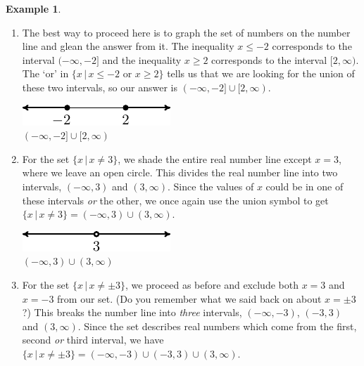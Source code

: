 \documentclass[11pt]{article}
\theoremstyle{definition}  %
\newtheorem{ex}{\bf Example}
\begin{document}
\begin{ex}
\begin{enumerate}
\begin{enumerate}

\item  The best way to proceed here is to graph the set of numbers on the number line and glean the answer from it.  The inequality $x \leq -2$ corresponds to the interval $(-\infty, -2]$ and the inequality $x \geq 2$ corresponds to the interval $[2, \infty)$. The `or' in $\{ x \, | \, x \leq -2 \, \, \text{or} \, \,  x \geq 2 \}$ tells us that we are looking for the union of these two intervals, so our answer is $(-\infty, -2] \cup [2, \infty)$.

\begin{center}

\includegraphics{SetTheory-19}  \\
$(-\infty, -2] \cup [2, \infty)$ 

\end{center}

\item For the set $\{ x \, | \, x \neq 3 \}$, we shade the entire real number line except $x=3$, where we leave an open circle.  This divides the real number line into two intervals, $(-\infty, 3)$ and $(3,\infty)$.  Since the values of $x$ could be in one of these intervals \textit{or} the other, we once again use the union symbol to get $\{ x \, | \, x \neq 3 \} = (-\infty, 3) \cup (3,\infty)$.
 
\begin{center}

\includegraphics{SetTheory-20}  \\



 $(-\infty, 3) \cup (3, \infty)$ 
 
 

\end{center}

\item  For the set $\{ x \, | \, x \neq \pm 3 \}$, we proceed as before and exclude both $x=3$ and $x=-3$ from our set. (Do you remember what we said back on \pageref{setsofnumbersboxonthispage} about $x = \pm 3$?)  This breaks the number line into \textit{three} intervals, $(-\infty, -3)$, $(-3,3)$ and $(3, \infty)$.   Since the set describes real numbers which come from the first, second \textit{or} third interval, we have $\{ x \, | \, x \neq \pm 3 \} = (-\infty, -3) \cup (-3,3) \cup (3, \infty)$.



\end{enumerate}
\end{enumerate}
\end{ex}
\end{document}
